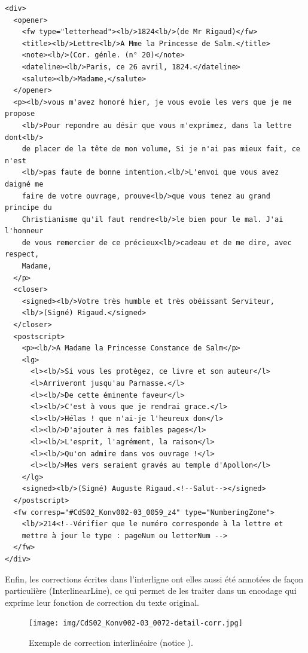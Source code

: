 \documentclass[a4paper,12pt,twoside]{book}
\begin{document}
			\begin{verbatim}
<div>
  <opener>
    <fw type="letterhead"><lb/>1824<lb/>(de Mr Rigaud)</fw>
    <title><lb/>Lettre<lb/>A Mme la Princesse de Salm.</title>
    <note><lb/>(Cor. génle. (n° 20)</note>
    <dateline><lb/>Paris, ce 26 avril, 1824.</dateline>
    <salute><lb/>Madame,</salute>
  </opener>
  <p><lb/>vous m'avez honoré hier, je vous evoie les vers que je me propose
    <lb/>Pour repondre au désir que vous m'exprimez, dans la lettre dont<lb/>
    de placer de la tête de mon volume, Si je n'ai pas mieux fait, ce n'est
    <lb/>pas faute de bonne intention.<lb/>L'envoi que vous avez daigné me 
    faire de votre ouvrage, prouve<lb/>que vous tenez au grand principe du 
    Christianisme qu'il faut rendre<lb/>le bien pour le mal. J'ai l'honneur 
    de vous remercier de ce précieux<lb/>cadeau et de me dire, avec respect, 
    Madame,
  </p>
  <closer>
    <signed><lb/>Votre très humble et très obéissant Serviteur,
    <lb/>(Signé) Rigaud.</signed>
  </closer>
  <postscript>
    <p><lb/>A Madame la Princesse Constance de Salm</p>
    <lg>
      <l><lb/>Si vous les protègez, ce livre et son auteur</l>
      <l>Arriveront jusqu'au Parnasse.</l>
      <l><lb/>De cette éminente faveur</l>
      <l><lb/>C'est à vous que je rendrai grace.</l>
      <l><lb/>Hélas ! que n'ai-je l'heureux don</l>
      <l><lb/>D'ajouter à mes faibles pages</l>
      <l><lb/>L'esprit, l'agrément, la raison</l>
      <l><lb/>Qu'on admire dans vos ouvrage !</l>
      <l><lb/>Mes vers seraient gravés au temple d'Apollon</l>
    </lg>
    <signed><lb/>(Signé) Auguste Rigaud.<!--Salut--></signed>
  </postscript>
  <fw corresp="#CdS02_Konv002-03_0059_z4" type="NumberingZone">
    <lb/>214<!--Vérifier que le numéro corresponde à la lettre et 
    mettre à jour le type : pageNum ou letterNum -->
  </fw>
</div>

			\end{verbatim}
		
			\normalsize
			Enfin, les corrections écrites dans l'interligne ont elles aussi été annotées de façon particulière (\textsf{InterlinearLine}), ce qui permet de les traiter dans un encodage qui exprime leur fonction de correction du texte original.
			
			\begin{figure}[!h]
				\centering
				\texttt{[image: img/CdS02\_Konv002-03\_0072-detail-corr.jpg]}
				\caption{Exemple de correction interlinéaire (notice \cite{CdS02072}).}
				\label{}
			\end{figure}
		
\end{document}
